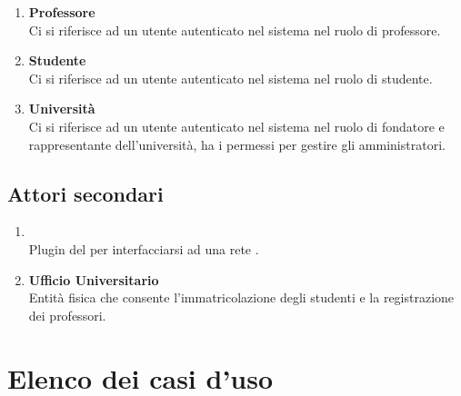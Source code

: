 \documentclass[AnalisiDeiRequisiti.tex]{subfiles}
\begin{document}
\begin{enumerate}
	\item \textbf{Professore}\\
	Ci si riferisce ad un utente autenticato nel sistema nel ruolo di professore.\\
	
	\item \textbf{Studente}\\
	Ci si riferisce ad un utente autenticato nel sistema nel ruolo di studente.\\
		
	\item \textbf{Università}\\
	Ci si riferisce ad un utente autenticato nel sistema nel ruolo di fondatore e rappresentante dell'università, ha i permessi per gestire gli amministratori.\\	
\end{enumerate}

\subsection{Attori secondari}
\begin{enumerate}
	\item \textbf{}\\
	Plugin del   per interfacciarsi ad una rete .\\
	
	\item \textbf{Ufficio Universitario}\\
	Entità fisica che consente l'immatricolazione degli studenti e la registrazione dei professori.\\
\end{enumerate}

\section{Elenco dei casi d'uso}
\end{document}
